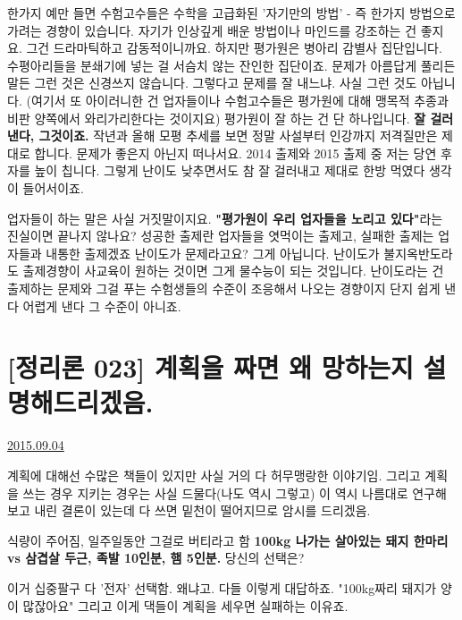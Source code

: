 한가지 예만 들면 수험고수들은 수학을 고급화된 '자기만의 방법' - 즉 한가지 방법으로 가려는 경향이 있습니다.
자기가 인상깊게 배운 방법이나 마인드를 강조하는 건 좋지요. 그건 드라마틱하고 감동적이니까요.
하지만 평가원은 병아리 감별사 집단입니다. 수평아리들을 분쇄기에 넣는 걸 서슴치 않는 잔인한 집단이죠.
문제가 아름답게 풀리든 말든 그런 것은 신경쓰지 않습니다. 그렇다고 문제를 잘 내느냐. 사실 그런 것도 아닙니다.
(여기서 또 아이러니한 건 업자들이나 수험고수들은 평가원에 대해 맹목적 추종과 비판 양쪽에서 와리가리한다는 것이지요)
평가원이 잘 하는 건 단 하나입니다. \textbf{잘 걸러낸다, 그것이죠.}
작년과 올해 모평 추세를 보면 정말 사설부터 인강까지 저격질만은 제대로 합니다. 문제가 좋은지 아닌지 떠나서요.
2014 출제와 2015 출제 중 저는 당연 후자를 높이 칩니다. 그렇게 난이도 낮추면서도 참 잘 걸러내고 제대로 한방 먹였다 생각이 들어서이죠.
\vspace{5mm}

업자들이 하는 말은 사실 거짓말이지요. \textbf{"평가원이 우리 업자들을 노리고 있다"}라는 진실이면 끝나지 않나요?
성공한 출제란 업자들을 엿먹이는 출제고, 실패한 출제는 업자들과 내통한 출제겠죠
난이도가 문제라고요? 그게 아닙니다. 난이도가 불지옥반도라도 출제경향이 사교육이 원하는 것이면 그게 물수능이 되는 것입니다.
난이도라는 건 출제하는 문제와 그걸 푸는 수험생들의 수준이 조응해서 나오는 경향이지 단지 쉽게 낸다 어렵게 낸다 그 수준이 아니죠.
\vspace{5mm}




\section{[정리론 023] 계획을 짜면 왜 망하는지 설명해드리겠음.}
\href{https://www.kockoc.com/Apoc/290346}{2015.09.04}

\vspace{5mm}

계획에 대해선 수많은 책들이 있지만 사실 거의 다 허무맹랑한 이야기임.
그리고 계획을 쓰는 경우 지키는 경우는 사실 드물다(나도 역시 그렇고)
이 역시 나름대로 연구해보고 내린 결론이 있는데 다 쓰면 밑천이 떨어지므로 암시를 드리겠음.
\vspace{5mm}

식량이 주어짐, 일주일동안 그걸로 버티라고 함
\textbf{100kg 나가는 살아있는 돼지 한마리 vs 삼겹살 두근, 족발 10인분, 햄 5인분.}
당신의 선택은?
\vspace{5mm}

이거 십중팔구 다 '전자' 선택함.
왜냐고. 다들 이렇게 대답하죠. "100kg짜리 돼지가 양이 많잖아요"
그리고 이게 댁들이 계획을 세우면 실패하는 이유죠.
\vspace{5mm}

